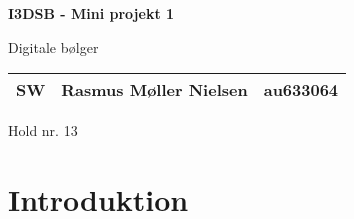 \documentclass{article}
\begin{document}

\begin{titlepage}

  \begin{center}
    \vspace*{1cm}

    \Huge
    \textbf{I3DSB - Mini projekt 1}

    \vspace{0.5cm}
    \huge
    Digitale bølger \\
    \date\today

    \vspace{1.5cm}

    \large
    \begin{tabular}{c|lr}
      \hline
      SW & Rasmus Møller Nielsen & au633064 \\
      \hline
    \end{tabular}


    \vfill
    \vspace{2cm}

    Hold nr. 13

  \end{center}
\end{titlepage}

\newpage
\newpage

\setcounter{page}{1}


\section{Introduktion}





\end{document}
